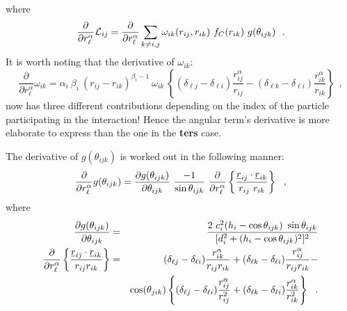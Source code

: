 \begin{itemize}
where
\begin{equation}
\frac{\partial}{\partial r_{\ell}^{\alpha}} {\cal{L}}_{ij} =
\frac{\partial}{\partial r_{\ell}^{\alpha}} \sum_{k \neq i,j}
\omega_{ik}(r_{ij},r_{ik})~f_{C}(r_{ik})~g(\theta_{ijk})~~.  \nonumber
\end{equation}
It is worth noting that the derivative of $\omega_{ik}$:
\begin{equation}
\frac{\partial}{\partial r_{\ell}^{\alpha}} \omega_{ik} =
\alpha_{i}~\beta_{i}~(r_{ij}-r_{ik})^{\beta_{i}-1}~\omega_{ik}~
\left\{ (\delta_{\ell j}-\delta_{\ell i}) \frac{r_{ij}^{\alpha}}{r_{ij}}-
(\delta_{\ell k}-\delta_{\ell i}) \frac{r_{ik}^{\alpha}}{r_{ik}} \right\}~~,
\end{equation}
now has three different contributions depending on the index of the
particle participating in the interaction!  Hence the angular term's
derivative is more elaborate to express than the one in the {\bf ters} case.
\end{itemize}

The derivative of $g(\theta_{ijk})$ is worked out in the following
manner:
\begin{equation}
\frac{\partial}{\partial r_{\ell}^{\alpha}} g(\theta_{ijk}) =
\frac{\partial g(\theta_{ijk})}{\partial \theta_{ijk}}~
\frac{-1}{\sin \theta_{ijk}}~\frac{\partial}{\partial r_{\ell}^{\alpha}}
\left\{ \frac{\mbox{$\underline{r}$}_{ij} \cdot \mbox{$\underline{r}$}_{ik}} {r_{ij}~r_{ik}} \right\}~~,
\end{equation}
where
\begin{eqnarray}
\frac{\partial g(\theta_{ijk})}{\partial \theta_{ijk}}&=&
\frac{2~c_{i}^{2}(h_{i} - \cos \theta_{ijk})~\sin \theta_{ijk}}
{[d_{i}^{2} + (h_{i} - \cos \theta_{ijk})^{2}]^{2}} \\
\frac{\partial}{\partial r_{\ell}^{\alpha}}
\left\{\frac{\mbox{$\underline{r}$}_{ij}\cdot\mbox{$\underline{r}$}_{ik}}{r_{ij}r_{ik}}\right\}&=&
(\delta_{\ell j}-\delta_{\ell i})\frac{r_{ik}^{\alpha}}{r_{ij}r_{ik}} +
(\delta_{\ell k}-\delta_{\ell i})\frac{r_{ij}^{\alpha}}{r_{ij}r_{ik}} - \nonumber \\
& & \cos(\theta_{jik}) \left\{(\delta_{\ell j}-\delta_{\ell i})\frac{r_{ij}^{\alpha}}{r_{ij}^{2}}+
(\delta_{\ell k}-\delta_{\ell i})\frac{r_{ik}^{\alpha}}{r_{ik}^{2}}\right\}~~.
\end{eqnarray}

